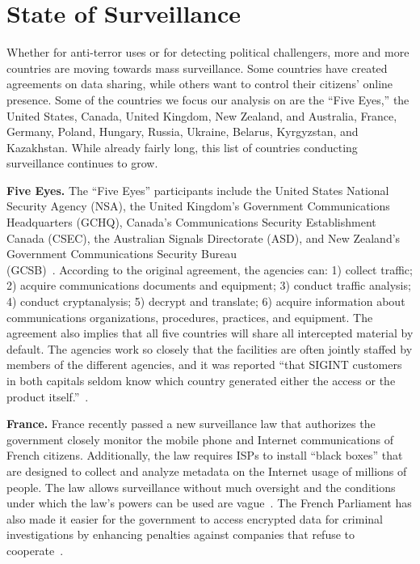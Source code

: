 \section{State of Surveillance}

Whether for anti-terror uses or for detecting political challengers, more and more countries are moving towards mass surveillance.  Some countries have created agreements on data sharing, while others want to control their citizens' online presence.  Some of the countries we focus our analysis on are the ``Five Eyes,'' the United States, Canada, United Kingdom, New Zealand, and Australia, France, Germany, Poland, Hungary, Russia, Ukraine, Belarus, Kyrgyzstan, and Kazakhstan.  While already fairly long, this list of countries conducting surveillance continues to grow.

{\bf Five Eyes.} The ``Five Eyes'' participants include the United States National Security Agency (NSA), the United Kingdom's Government Communications Headquarters (GCHQ), Canada's Communications Security Establishment Canada (CSEC), the Australian Signals Directorate (ASD), and New Zealand's Government Communications Security Bureau \\(GCSB)~\cite{eyeswideopen}.  According to the original agreement, the agencies can: 1) collect traffic; 2) acquire communications documents and equipment; 3) conduct traffic analysis; 4) conduct cryptanalysis; 5) decrypt and translate; 6) acquire information about communications organizations, procedures, practices, and equipment.  The agreement also implies that all five countries will share all intercepted material by default.  The agencies work so closely that the facilities are often jointly staffed by members of the different agencies, and it was reported ``that SIGINT customers in both capitals seldom know which country generated either the access or the product itself.''~\cite{lander2004international}.

{\bf France.} France recently passed a new surveillance law that authorizes the government closely monitor the mobile phone and Internet communications of French citizens.  Additionally, the law requires ISPs to install ``black boxes'' that are designed to collect and analyze metadata on the Internet usage of millions of people.  The law allows surveillance without much oversight and the conditions under which the law's powers can be used are vague~\cite{francesurv}. The French Parliament has also made it easier for the government to access encrypted data for criminal investigations by enhancing penalties against companies that refuse to cooperate~\cite{francesurv2}.

